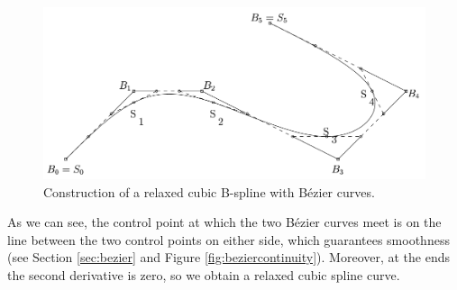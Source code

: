 \documentclass[]{usiinfbachelorproject}
\begin{document}
\begin{figure}[ht]
	\centering
	\includegraphics[width=1\textwidth]{img/spline_points3.png}
	\caption{Construction of a relaxed cubic B-spline with B\'ezier curves.}
	\label{fig:subdivision}
\end{figure}

\noindent As we can see, the control point at which the two B\'ezier curves meet is on the line between the two control points on either side, which guarantees smoothness (see Section \ref{sec:bezier} and Figure \ref{fig:beziercontinuity}). Moreover, at the ends the second derivative is zero, so we obtain a relaxed cubic spline curve.\\
\end{document}

